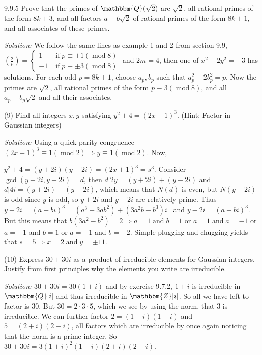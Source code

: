 \documentclass{letter}
\newcommand{\tmem}[1]{{\em #1\/}}
\newcommand{\tmop}[1]{\ensuremath{\operatorname{#1}}}
\begin{document}
9.9.5 Prove that the primes of $\mathbbm{Q}( \sqrt{2})$ are $\sqrt{2}$, all
rational primes of the form $8 k + 3$, and all factors $a + b \sqrt{2}$ of
rational primes of the form $8 k \pm 1$, and all associates of these primes.

{\tmem{Solution:}} We follow the same lines as example 1 and 2 from section
9.9, $\left( \frac{2}{p} \right) = \left\{ \begin{array}{ll}
  1 & \tmop{if} p \equiv \pm 1 (\tmop{mod} 8)\\
  - 1 & \tmop{if} p \equiv \pm 3 (\tmop{mod} 8)
\end{array} \right.$ and $2 m = 4$, then one of $x^2 - 2 y^2 = \pm 3$ has
solutions. For each odd $p = 8 k + 1$, choose $a_p, b_p$ such that $a_p^2 - 2
b_p^2 = p$. Now the primes are $\sqrt{2}$, all rational primes of the form $p
\equiv 3 (\tmop{mod} 8)$, and all $a_p \pm b_p \sqrt{2}$ and all their
associates.

(9) Find all integers $x, y$ satisfying $y^2 + 4 = (2 x + 1)^3$. (Hint: Factor
in Gaussian integers)

{\tmem{Solution:}} Using a quick parity congruence $(2 x + 1)^3 \equiv 1
(\tmop{mod} 2) \Rightarrow y \equiv 1 (\tmop{mod} 2)$. Now,

$y^2 + 4 = (y + 2 i) (y - 2 i) = (2 x + 1)^3 = s^3$. Consider $\gcd (y + 2 i,
y - 2 i) = d$, then $d | 2 y = (y + 2 i) + (y - 2 i)$ and $d | 4 i = (y + 2 i)
- (y - 2 i)$, which means that $N (d)$ is even, but $N (y + 2 i)$ is odd since
$y$ is odd, so $y + 2 i$ and $y - 2 i$ are relatively prime. Thus $y + 2 i =
(a + b i)^3 = (a^3 - 3 a b^2) + (3 a^2 b - b^3) i$ \ and $y - 2 i = (a - b
i)^3$. But this means that $b (3 a^2 - b^2) = 2 \Rightarrow a = 1 \tmop{and} b
= 1$ or $a = 1 \tmop{and} a = - 1$ or $a = - 1$ and $b = 1$ or $a = - 1$ and
$b = - 2$. Simple plugging and chugging yields that $s = 5 \Rightarrow x = 2
\tmop{and} y = \pm 11$.

(10) Express $30 + 30 i$ as a product of irreducible elements for Gaussian
integers. Justify from first principles why the elements you write are
irreducible.

{\tmem{Solution:}} $30 + 30 i = 30 (1 + i)$ and by exercise 9.7.2, $1 + i$ is
irreducible in $\mathbbm{Q}[i]$ and thus irreducible in $\mathbbm{Z}[i]$. So
all we have left to factor is 30. But $30 = 2 \cdot 3 \cdot 5$, which we see
by using the norm, that $3$ is irreducible. We can further factor $2 = (1 + i)
(1 - i)$ and $5 = (2 + i) (2 - i)$, all factors which are irreducible by once
again noticing that the norm is a prime integer. So $30 + 30 i = 3 (1 + i)^2
(1 - i) (2 + i) (2 - i)$.
\end{document}
